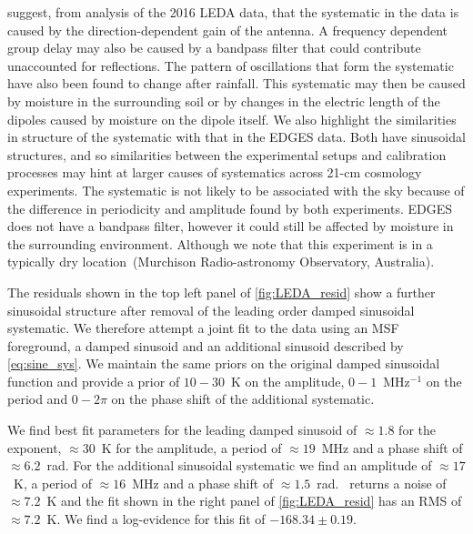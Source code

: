 \cite{Price_LEDA_2018} suggest, from analysis of the 2016 LEDA data, that the systematic in the data is caused by the direction-dependent gain of the antenna. A frequency dependent group delay may also be caused by a bandpass filter that could contribute unaccounted for reflections. The pattern of oscillations that form the systematic have also been found to change after rainfall. This systematic may then be caused by moisture in the surrounding soil or by changes in the electric length of the dipoles caused by moisture on the dipole itself. We also highlight the similarities in structure of the systematic with that in the EDGES data. Both have sinusoidal structures, and so similarities between the experimental setups and calibration processes may hint at larger causes of systematics across 21-cm cosmology experiments. The systematic is not likely to be associated with the sky because of the difference in periodicity and amplitude found by both experiments. EDGES does not have a bandpass filter, however it could still be affected by moisture in the surrounding environment. Although we note that this experiment is in a typically dry location~(Murchison Radio-astronomy Observatory, Australia). 

The residuals shown in the top left panel of \cref{fig:LEDA_resid} show a further sinusoidal structure after removal of the leading order damped sinusoidal systematic. We therefore attempt a joint fit to the data using an MSF foreground, a damped sinusoid and an additional sinusoid described by \cref{eq:sine_sys}. We maintain the same priors on the original damped sinusoidal function and provide a prior of $10-30$~K on the amplitude, $0-1$~MHz$^{-1}$ on the period and $0-2\pi$ on the phase shift of the additional systematic.

We find best fit parameters for the leading damped sinusoid of $\approx 1.8$ for the exponent, $\approx 30$~K for the amplitude, a period of $\approx 19$~MHz and a phase shift of $\approx 6.2$~rad. For the additional sinusoidal systematic we find an amplitude of $\approx 17$~K, a period of $\approx 16$~MHz and a phase shift of $\approx 1.5$~rad. \multinest~returns a noise of $\approx 7.2$~K and the fit shown in the right panel of \cref{fig:LEDA_resid} has an RMS of $\approx 7.2$~K. We find a log-evidence for this fit of $-168.34\pm0.19$.

